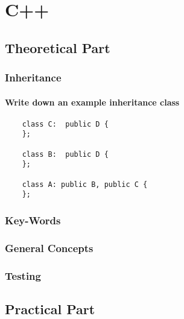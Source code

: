 \chapter{C++}

%

\section{Theoretical Part}

\subsection{Inheritance}
\subsubsection{Write down an example inheritance class}
\begin{lstlisting}
    class C:  public D {
    };

    class B:  public D {
    };

    class A: public B, public C {
    };
\end{lstlisting}

\subsection{Key-Words}
\subsection{General Concepts}
\subsection{Testing}





\section{Practical Part}


